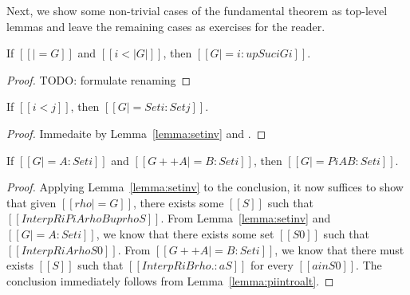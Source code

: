 \documentclass[nonacm]{acmart}
\begin{document}
Next, we show some non-trivial cases of the fundamental theorem as
top-level lemmas and leave the remaining cases as exercises for the reader.
\begin{lemma}[ST-Var]
  \label{lemma:stvar}
  If $[[|= G]]$ and $[[i < |G|]]$, then $[[G |= i : up Suc i G i]]$.
\end{lemma}
\begin{proof}
  TODO: formulate renaming
\end{proof}

\begin{lemma}[ST-Set]
  \label{lemma:stset}
  If $[[i < j]]$, then $[[G |= Set i : Set j]]$.
\end{lemma}
\begin{proof}
  Immedaite by Lemma~\ref{lemma:setinv} and .
\end{proof}

\begin{lemma}[ST-Pi]
  \label{lemma:stpi}
  If $[[G |= A : Set i]]$ and $[[G ++ A |= B : Set i]]$, then $[[G |= Pi
  A B : Set i]]$.
\end{lemma}
\begin{proof}
  Applying Lemma~\ref{lemma:setinv} to the
  conclusion, it now suffices to show that given $[[rho |= G]]$, there
  exists some $[[S]]$ such that $[[InterpR i Pi A{rho} B{up rho} S]]$.
  From Lemma~\ref{lemma:setinv} and $[[G |= A : Set i]]$, we know that
  there exists some set $[[S0]]$ such that $[[InterpR i A {rho} S0]]$.
From $[[G ++ A |= B : Set i]]$, we know that there must
exists $[[S]]$ such that $[[InterpR i B {rho .: a} S]]$ for every $[[a
in S0]]$. The conclusion immediately follows from Lemma~\ref{lemma:piintroalt}.
\end{proof}
\end{document}
